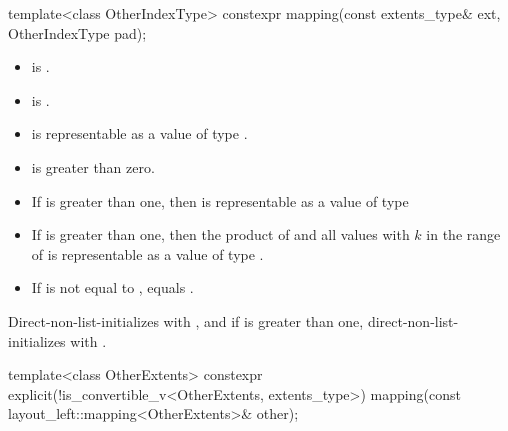 %
\begin{itemdecl}
template<class OtherIndexType>
constexpr mapping(const extents_type& ext, OtherIndexType pad);
\end{itemdecl}

\begin{itemdescr}
\pnum
\constraints
\begin{itemize}
\item
{} is .
\item
{} is .
\end{itemize}

\pnum
\expects
\begin{itemize}
\item
{} is representable as a value of type .
\item
{} is greater than zero.
\item
If  is greater than one,
then 
is representable as a value of type 
\item
If  is greater than one,
then the product of
 and
all values 
with $k$ in the range of 
is representable as a value of type .
\item
If  is not equal to ,
 equals .
\end{itemize}

\pnum
\effects
Direct-non-list-initializes  with , and
if  is greater than one,
direct-non-list-initializes  with
.
\end{itemdescr}

%
\begin{itemdecl}
template<class OtherExtents>
  constexpr explicit(!is_convertible_v<OtherExtents, extents_type>)
    mapping(const layout_left::mapping<OtherExtents>& other);
\end{itemdecl}

